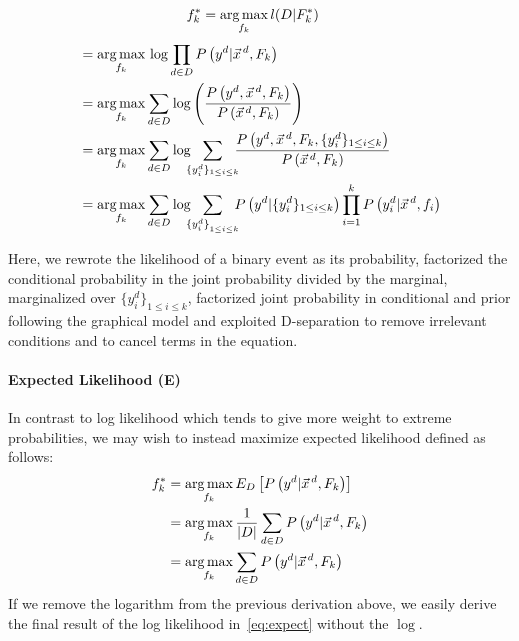 {\small 
\begin{align}
f_k^*&=\argmax_{f_k} l(D|F^*_k) \nonumber
\end{align}
\begin{align}
&=\argmax_{f_k}\,\log\prod_{d\in D}P\left(y^d|\vec{x}^{\,d},F_k\right)\nonumber\\
&=\argmax_{f_k}\sum_{d\in D}\log\left(\frac{P\left(y^d,\vec{x}^{\,d},F_k\right)}{P\left(\vec{x}^{\,d},F_k\right)}\right)\nonumber \\
&=\argmax_{f_k}\sum_{d\in D}\log \!\!\! \sum_{\{y_i^d\}_{1\leq i\leq k}} \!\!\! \frac{P\left(y^d,\vec{x}^{\,d}, F_k,\{y_i^d\}_{1\leq i\leq k}\right)}{P\left(\vec{x}^{\,d},F_k\right)}\nonumber\\
&=\argmax_{f_k}\sum_{d\in D}\log \!\!\! \sum_{{\{y_i^d\}}_{1\leq i\leq k}} \!\!\! P\left(y^d|\{y^d_i\}_{1\leq i\leq k}\right) \prod_{i=1}^kP\left(y_i^d|\vec{x}^{\,d},f_i\right) \label{eq:expect} 
\end{align}}

Here, we rewrote the likelihood of a binary event as its probability,
factorized the conditional probability in the joint probability
divided by the marginal, marginalized over $\{y^d_i\}_{1\leq i\leq
  k}$, factorized joint probability in conditional and prior following
the graphical model and exploited D-separation to remove irrelevant
conditions and to cancel terms in the equation.

\paragraph{Expected Likelihood (E)}

In contrast to log likelihood which tends to give more weight to extreme
probabilities, we may wish to instead maximize expected likelihood
defined as follows:
\begin{align*}
f_k^*&=\argmax_{f_k}E_D\left[P\left(y^d|\vec{x}^{\,d},F_k\right)\right]\nonumber\\
&=\argmax_{f_k}\frac{1}{|D|}\sum_{d\in D} P\left(y^d | \vec{x}^{\,d},F_k\right)\nonumber\\
&=\argmax_{f_k} \sum_{d\in D} P\left(y^d | \vec{x}^{\,d},F_k\right)\nonumber\\
\end{align*}
If we remove the logarithm from the previous derivation above, we easily
derive the final result of the log likelihood in~\eqref{eq:expect} without the $\log$.

